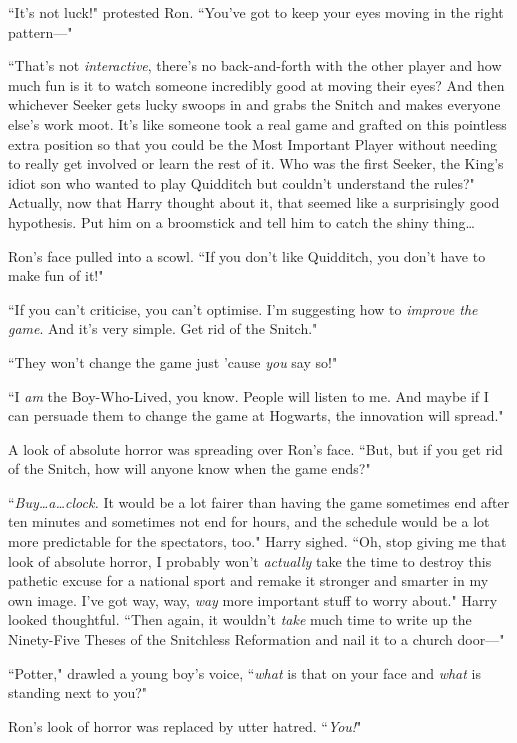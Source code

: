 ``It's not luck!" protested Ron. ``You've got to keep your eyes moving in the right pattern—"

``That's not \emph{interactive}, there's no back-and-forth with the other player and how much fun is it to watch someone incredibly good at moving their eyes? And then whichever Seeker gets lucky swoops in and grabs the Snitch and makes everyone else's work moot. It's like someone took a real game and grafted on this pointless extra position so that you could be the Most Important Player without needing to really get involved or learn the rest of it. Who was the first Seeker, the King's idiot son who wanted to play Quidditch but couldn't understand the rules?" Actually, now that Harry thought about it, that seemed like a surprisingly good hypothesis. Put him on a broomstick and tell him to catch the shiny thing…

Ron's face pulled into a scowl. ``If you don't like Quidditch, you don't have to make fun of it!"

``If you can't criticise, you can't optimise. I'm suggesting how to \emph{improve the game}. And it's very simple. Get rid of the Snitch."

``They won't change the game just 'cause \emph{you} say so!"

``I \emph{am} the Boy-Who-Lived, you know. People will listen to me. And maybe if I can persuade them to change the game at Hogwarts, the innovation will spread."

A look of absolute horror was spreading over Ron's face. ``But, but if you get rid of the Snitch, how will anyone know when the game ends?"

``\emph{Buy…a…clock.} It would be a lot fairer than having the game sometimes end after ten minutes and sometimes not end for hours, and the schedule would be a lot more predictable for the spectators, too." Harry sighed. ``Oh, stop giving me that look of absolute horror, I probably won't \emph{actually} take the time to destroy this pathetic excuse for a national sport and remake it stronger and smarter in my own image. I've got way, way, \emph{way} more important stuff to worry about." Harry looked thoughtful. ``Then again, it wouldn't \emph{take} much time to write up the Ninety-Five Theses of the Snitchless Reformation and nail it to a church door—"

``Potter," drawled a young boy's voice, ``\emph{what} is that on your face and \emph{what} is standing next to you?"

Ron's look of horror was replaced by utter hatred. ``\emph{You!}"

